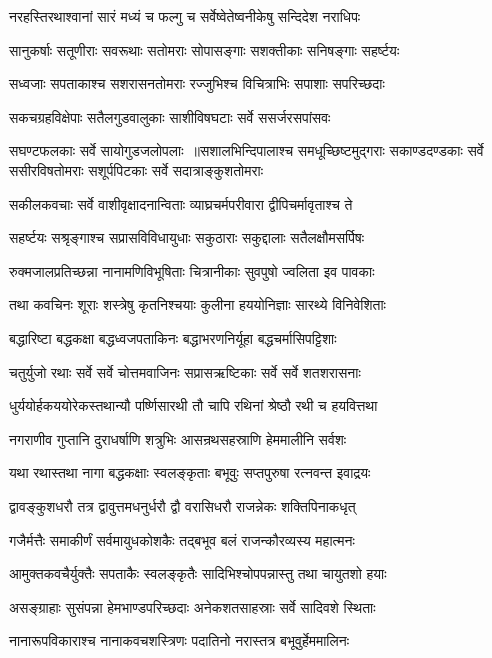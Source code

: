 \twolineshloka
{नरहस्तिरथाश्वानां सारं मध्यं च फल्गु च}
{सर्वेष्वेतेष्वनीकेषु सन्दिदेश नराधिपः}


\threelineshloka
{सानुकर्षाः सतूणीराः सवरूथाः सतोमराः}
{सोपासङ्गाः सशक्तीकाः सनिषङ्गाः सहर्ष्टयः}
{}


\twolineshloka
{सध्वजाः सपताकाश्च सशरासनतोमराः}
{रज्जुभिश्च विचित्राभिः सपाशाः सपरिच्छदाः}


\twolineshloka
{सकचग्रहविक्षेपाः सतैलगुडवालुकाः}
{साशीविषघटाः सर्वे ससर्जरसपांसवः}


सघण्टफलकाः सर्वे सायोगुडजलोपलाः ॥सशालभिन्दिपालाश्च समधूच्छिष्टमुद्गराः
\twolineshloka
{सकाण्डदण्डकाः सर्वे ससीरविषतोमराः}
{सशूर्पपिटकाः सर्वे सदात्राङ्कुशतोमराः}


\twolineshloka
{सकीलकवचाः सर्वे वाशीवृक्षादनान्विताः}
{व्याघ्रचर्मपरीवारा द्वीपिचर्मावृताश्च ते}


\twolineshloka
{सहर्ष्टयः सश्रृङ्गाश्च सप्रासविविधायुधाः}
{सकुठाराः सकुद्दालाः सतैलक्षौमसर्पिषः}


\twolineshloka
{रुक्मजालप्रतिच्छन्ना नानामणिविभूषिताः}
{चित्रानीकाः सुवपुषो ज्वलिता इव पावकाः}


\twolineshloka
{तथा कवचिनः शूराः शस्त्रेषु कृतनिश्चयाः}
{कुलीना हययोनिज्ञाः सारथ्ये विनिवेशिताः}


\twolineshloka
{बद्धारिष्टा बद्धकक्षा बद्धध्वजपताकिनः}
{बद्धाभरणनिर्यूहा बद्धचर्मासिपट्टिशाः}


\twolineshloka
{चतुर्युजो रथाः सर्वे सर्वे चोत्तमवाजिनः}
{सप्रासऋष्टिकाः सर्वे सर्वे शतशरासनाः}


\twolineshloka
{धुर्ययोर्हकययोरेकस्तथान्यौ पर्ष्णिसारथी}
{तौ चापि रथिनां श्रेष्ठौ रथी च हयवित्तथा}


\twolineshloka
{नगराणीव गुप्तानि दुराधर्षाणि शत्रुभिः}
{आसन्रथसहस्राणि हेममालीनि सर्वशः}


\twolineshloka
{यथा रथास्तथा नागा बद्धकक्षाः स्वलङ्कृताः}
{बभूवुः सप्तपुरुषा रत्नवन्त इवाद्रयः}


\twolineshloka
{द्वावङ्कुशधरौ तत्र द्वावुत्तमधनुर्धरौ}
{द्वौ वरासिधरौ राजन्नेकः शक्तिपिनाकधृत्}


\twolineshloka
{गजैर्मत्तैः समाकीर्णं सर्वमायुधकोशकैः}
{तद्बभूव बलं राजन्कौरव्यस्य महात्मनः}


\twolineshloka
{आमुक्तकवचैर्युक्तैः सपताकैः स्वलङ्कृतैः}
{सादिभिश्चोपपन्नास्तु तथा चायुतशो हयाः}


\twolineshloka
{असङ्ग्राहाः सुसंपन्ना हेमभाण्डपरिच्छदाः}
{अनेकशतसाहस्राः सर्वे सादिवशे स्थिताः}


\twolineshloka
{नानारूपविकाराश्च नानाकवचशस्त्रिणः}
{पदातिनो नरास्तत्र बभूवुर्हेममालिनः}


